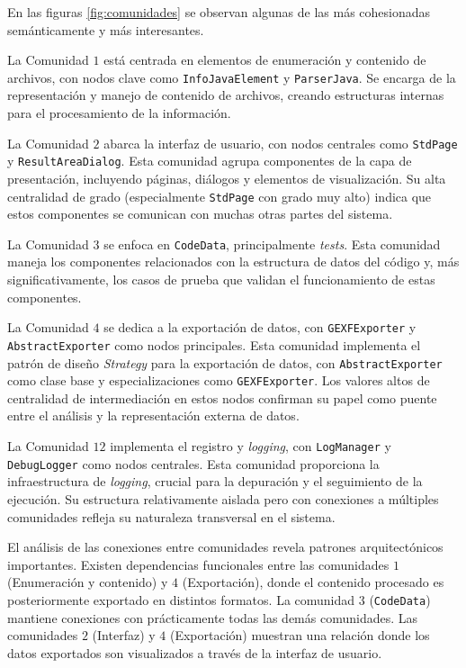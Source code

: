 \documentclass[12pt,letterpaper]{article}
\begin{document}
En las figuras \ref{fig:comunidades} se observan algunas de las más cohesionadas semánticamente y más interesantes. 

La Comunidad $1$ está centrada en elementos de enumeración y contenido de archivos, con nodos clave como \texttt{InfoJavaElement} y \texttt{ParserJava}. Se encarga de la representación y manejo de contenido de archivos, creando estructuras internas para el procesamiento de la información.

La Comunidad $2$ abarca la interfaz de usuario, con nodos centrales como \texttt{StdPage} y \texttt{ResultAreaDialog}. Esta comunidad agrupa componentes de la capa de presentación, incluyendo páginas, diálogos y elementos de visualización. Su alta centralidad de grado (especialmente \texttt{StdPage} con grado muy alto) indica que estos componentes se comunican con muchas otras partes del sistema.

La Comunidad $3$ se enfoca en \texttt{CodeData}, principalmente \textit{tests}. Esta comunidad maneja los componentes relacionados con la estructura de datos del código y, más significativamente, los casos de prueba que validan el funcionamiento de estas componentes.

La Comunidad $4$ se dedica a la exportación de datos, con \texttt{GEXFExporter} y \texttt{AbstractExporter} como nodos principales. Esta comunidad implementa el patrón de diseño \textit{Strategy} para la exportación de datos, con \texttt{AbstractExporter} como clase base y especializaciones como \texttt{GEXFExporter}. Los valores altos de centralidad de intermediación en estos nodos confirman su papel como puente entre el análisis y la representación externa de datos.

La Comunidad $12$ implementa el registro y \textit{logging}, con \texttt{LogManager} y \texttt{DebugLogger} como nodos centrales. Esta comunidad proporciona la infraestructura de \textit{logging}, crucial para la depuración y el seguimiento de la ejecución. Su estructura relativamente aislada pero con conexiones a múltiples comunidades refleja su naturaleza transversal en el sistema.

El análisis de las conexiones entre comunidades revela patrones arquitectónicos importantes. Existen dependencias funcionales entre las comunidades $1$ (Enumeración y contenido) y $4$ (Exportación), donde el contenido procesado es posteriormente exportado en distintos formatos. La comunidad $3$ (\texttt{CodeData}) mantiene conexiones con prácticamente todas las demás comunidades. Las comunidades $2$ (Interfaz) y $4$ (Exportación) muestran una relación donde los datos exportados son visualizados a través de la interfaz de usuario.
\end{document}
